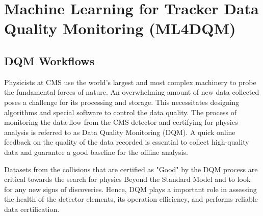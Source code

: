 \chapter{Machine Learning for Tracker Data Quality Monitoring (ML4DQM) \label{ch:DQM}}

\section{DQM Workflows}

Physicists at CMS use the world’s largest and most complex machinery to probe the fundamental forces of nature. An overwhelming amount of new data collected poses a challenge for its processing and storage. This necessitates designing algorithms and special software to control the data quality. The process of monitoring the data flow from the CMS detector and certifying for physics analysis is referred to as Data Quality Monitoring (DQM). A quick online feedback on the quality of the data recorded is essential to collect high-quality data and guarantee a good baseline for the offline analysis.


Datasets from the collisions that are certified as "Good" by the DQM process are critical towards the search for physics Beyond the Standard  Model and to look for any new signs of discoveries. Hence, DQM plays a important role in assessing the health of the detector elements, its operation efficiency, and performs reliable data certification\cite{refId0}.



